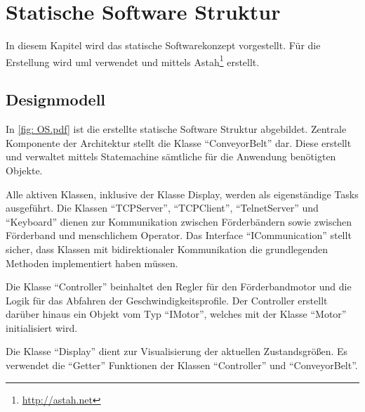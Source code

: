 \documentclass[./\jobname.tex]{subfiles}
\begin{document}
%
%
\chapter{Statische Software Struktur}
%
In diesem Kapitel wird das statische Softwarekonzept vorgestellt. Für die Erstellung wird \gls{uml} verwendet und mittels Astah\footnote{\url{http://astah.net}} erstellt.
%
\section{Designmodell}
%
In \autoref{fig: OS.pdf} ist die erstellte statische Software Struktur abgebildet. Zentrale Komponente der Architektur stellt die Klasse \enquote{ConveyorBelt} dar. Diese erstellt und verwaltet mittels Statemachine sämtliche für die Anwendung benötigten Objekte.\par
%
Alle aktiven Klassen, inklusive der Klasse Display, werden als eigenständige Tasks ausgeführt.
Die Klassen \enquote{TCPServer}, \enquote{TCPClient}, \enquote{TelnetServer} und \enquote{Keyboard} dienen zur Kommunikation zwischen Förderbändern sowie zwischen Förderband und menschlichem Operator. Das Interface \enquote{ICommunication} stellt sicher, dass Klassen mit bidirektionaler Kommunikation die grundlegenden Methoden implementiert haben müssen.\par
%
Die Klasse \enquote{Controller} beinhaltet den Regler für den Förderbandmotor und die Logik für das Abfahren der Geschwindigkeitsprofile. Der Controller erstellt darüber hinaus ein Objekt vom Typ \enquote{IMotor}, welches mit der Klasse \enquote{Motor} initialisiert wird.\par
%
Die Klasse \enquote{Display} dient zur Visualisierung der aktuellen Zustandsgrößen. Es verwendet die \enquote{Getter} Funktionen der Klassen \enquote{Controller} und \enquote{ConveyorBelt}.
%
\end{document}
